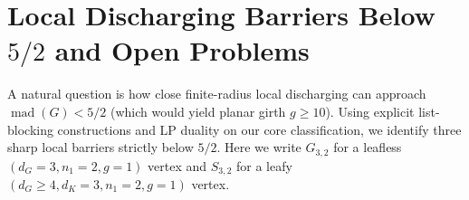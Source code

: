 \documentclass[11pt,a4paper]{article}
\theoremstyle{definition}
\newcommand{\mad}{\operatorname{mad}}
\begin{document}
\section{Local Discharging Barriers Below \texorpdfstring{$5/2$}{5/2} and Open Problems}\label{sec:barriers}

A natural question is how close finite-radius local discharging can approach $\mad(G) < 5/2$ (which would yield planar girth $g \ge 10$). Using explicit list-blocking constructions and LP duality on our core classification, we identify three sharp local barriers strictly below $5/2$. Here we write $G_{3,2}$ for a leafless $(d_G = 3, n_1 = 2, g = 1)$ vertex and $S_{3,2}$ for a leafy $(d_G \ge 4, d_K = 3, n_1 = 2, g = 1)$ vertex.
\end{document}
